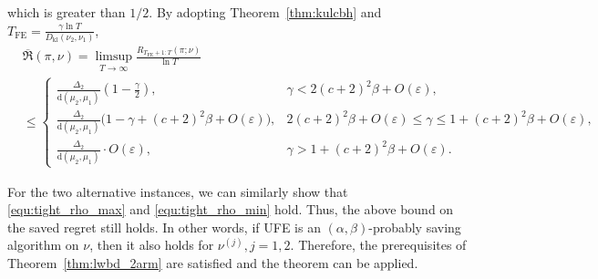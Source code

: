 \documentclass[twoside,11pt]{article}
\newcommand{\kl}{D_{\mathrm{kl}}}
\newcommand{\rmd}{\mathrm{d}}
\newcommand{\Tfe}{T_{\mathrm{FE}}}
\newcommand{\ouralgfe}{\textsc{UFE}}
\begin{document}
which is greater than $1/2$.
By adopting Theorem~\ref{thm:kulcbh} and $\Tfe = \frac{\gamma\ln T}{\kl(\nu_2,\nu_1)}$, 
\begin{align}\label{equ:tight_up}
    &\overline{\mathfrak{R}}(\pi,\nu)=\limsup_{T\to\infty}  \frac{R_{\Tfe+1:T} (\pi;\nu )}{\ln T}
    \\&
    \leq   
    \begin{cases}
        \frac{\Delta_{2}}{\rmd(\mu_2,\mu_1)}(1-\frac{\gamma}{2}), &\gamma < 2 (c+2)^2\beta + O(\varepsilon),  
        \\
        \frac{\Delta_{2}}{\rmd(\mu_2,\mu_1)}\big(1-\gamma+(c+2)^2\beta+O(\varepsilon)\big)  ,&
             2 (c+2)^2\beta + O(\varepsilon) \leq \gamma \leq
            1 + (c+2)^2\beta + O(\varepsilon),
        \\
        \frac{\Delta_{2}}{\rmd(\mu_2,\mu_1)}\cdot O(\varepsilon) , & \gamma> 1 + (c+2)^2\beta + O(\varepsilon).
    \end{cases}
\end{align}


For the two alternative instances, we can similarly show that \eqref{equ:tight_rho_max} and \eqref{equ:tight_rho_min} hold. Thus, the above bound on the saved regret still holds. In other words, if \ouralgfe{} is an $(\alpha,\beta)$-probably saving algorithm on $\nu$, then it also holds for $\nu^{(j)},j=1,2.$
Therefore, the prerequisites of Theorem~\ref{thm:lwbd_2arm} are satisfied and the theorem can be applied.
\end{document}
